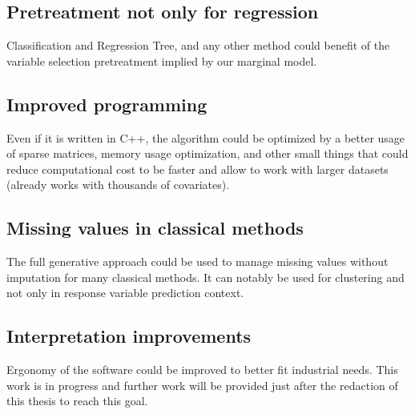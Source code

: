 \documentclass[12pt,a4paper]{report}
\begin{document}
		\subsection{Pretreatment not only for regression}
			Classification and Regression Tree, and any other method could benefit of the variable selection pretreatment implied by our marginal model.
		\subsection{Improved programming}
			Even if it is written in C++, the algorithm could be optimized by a better usage of sparse matrices, memory usage optimization, and other small things that could reduce computational cost to be faster and allow to work with larger datasets (already works with thousands of covariates).
		\subsection{Missing values in classical methods}
			The full generative approach could be used to manage missing values without imputation for many classical methods.
			It can notably be used for clustering and not only in response variable prediction context.
		\subsection{Interpretation improvements}
			Ergonomy of the software could be improved to better fit industrial needs. This work is in progress and further work will be provided just after the redaction of this thesis to reach this goal.
\cleardoublepage
\end{document}

